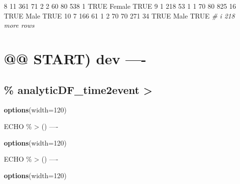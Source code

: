 \documentclass[
]{article}
\newenvironment{Shaded}{\begin{snugshade}}{\end{snugshade}}
\newcommand{\AttributeTok}[1]{\textcolor[rgb]{0.13,0.29,0.53}{#1}}
\newcommand{\CommentTok}[1]{\textcolor[rgb]{0.56,0.35,0.01}{\textit{#1}}}
\newcommand{\ConstantTok}[1]{\textcolor[rgb]{0.56,0.35,0.01}{#1}}
\newcommand{\DecValTok}[1]{\textcolor[rgb]{0.00,0.00,0.81}{#1}}
\newcommand{\FunctionTok}[1]{\textcolor[rgb]{0.13,0.29,0.53}{\textbf{#1}}}
\newcommand{\NormalTok}[1]{#1}
\begin{document}
\begin{Shaded}
\begin{Highlighting}[]
 \DecValTok{8}    \DecValTok{11}   \DecValTok{361}    \DecValTok{71}     \DecValTok{2}       \DecValTok{2}       \DecValTok{60}        \DecValTok{80}      \DecValTok{538}       \DecValTok{1} \ConstantTok{TRUE}\NormalTok{  Female }\ConstantTok{TRUE}           
 \DecValTok{9}     \DecValTok{1}   \DecValTok{218}    \DecValTok{53}     \DecValTok{1}       \DecValTok{1}       \DecValTok{70}        \DecValTok{80}      \DecValTok{825}      \DecValTok{16} \ConstantTok{TRUE}\NormalTok{  Male   }\ConstantTok{TRUE}           
\DecValTok{10}     \DecValTok{7}   \DecValTok{166}    \DecValTok{61}     \DecValTok{1}       \DecValTok{2}       \DecValTok{70}        \DecValTok{70}      \DecValTok{271}      \DecValTok{34} \ConstantTok{TRUE}\NormalTok{  Male   }\ConstantTok{TRUE}           
\CommentTok{\# i 218 more rows}
\end{Highlighting}
\end{Shaded}

\hypertarget{start-dev--}{%
\section{@@ START) dev ----}\label{start-dev--}}

\hypertarget{analyticdf_time2event}{%
\subsection{\% analyticDF\_time2event
\textbar\textgreater{}}\label{analyticdf_time2event}}

\begin{Shaded}
\begin{Highlighting}[]
\FunctionTok{options}\NormalTok{(}\AttributeTok{width=}\DecValTok{120}\NormalTok{)}
\end{Highlighting}
\end{Shaded}

ECHO \% \textbar\textgreater{} () ----

\begin{Shaded}
\begin{Highlighting}[]
\FunctionTok{options}\NormalTok{(}\AttributeTok{width=}\DecValTok{120}\NormalTok{)}
\end{Highlighting}
\end{Shaded}

ECHO \% \textbar\textgreater{} () ----

\begin{Shaded}
\begin{Highlighting}[]
\FunctionTok{options}\NormalTok{(}\AttributeTok{width=}\DecValTok{120}\NormalTok{)}
\end{Highlighting}
\end{Shaded}
\end{document}
